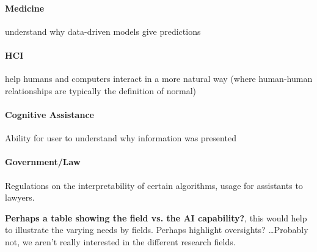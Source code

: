     \paragraph{Medicine} understand why data-driven models give predictions
    \paragraph{HCI} help humans and computers interact in a more natural way (where human-human relationships are typically the definition of normal)
    \paragraph{Cognitive Assistance} Ability for user to understand why information was presented
    \paragraph{Government/Law} Regulations on the interpretability of certain algorithms, usage for assistants to lawyers.

    \textbf{Perhaps a table showing the field vs. the AI capability?}, this would help to illustrate the varying needs by fields. Perhaps highlight oversights? \ldots Probably not, we aren't really interested in the different research fields.





